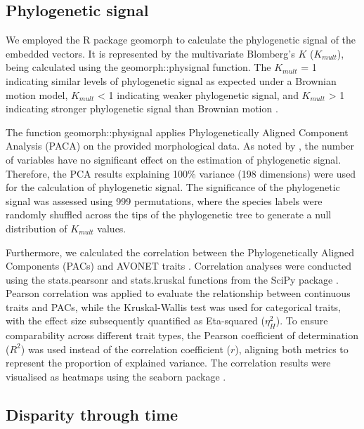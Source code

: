 \subsection{Phylogenetic signal}\label{subsec:mm-phylogenetic-signal}

We employed the R package geomorph to calculate the phylogenetic signal of the embedded vectors. It is represented by the multivariate Blomberg's $ K $ ($ K_{mult} $), being calculated using the geomorph::physignal function. The $ K_{mult} $ = 1 indicating similar levels of phylogenetic signal as expected under a Brownian motion model, $ K_{mult} $ < 1 indicating weaker phylogenetic signal, and $ K_{mult} $ > 1 indicating stronger phylogenetic signal than Brownian motion \parencite{adams2014generalized}. 

The function geomorph::physignal applies Phylogenetically Aligned Component Analysis (PACA) on the provided morphological data. As noted by \textcite{collyer2021phylogenetically}, the number of variables have no significant effect on the estimation of phylogenetic signal. Therefore, the PCA results explaining 100\% variance (198 dimensions) were used for the calculation of phylogenetic signal. The significance of the phylogenetic signal was assessed using 999 permutations, where the species labels were randomly shuffled across the tips of the phylogenetic tree to generate a null distribution of $ K_{mult} $ values.

Furthermore, we calculated the correlation between the Phylogenetically Aligned Components (PACs) and AVONET traits \parencite{tobias2022avonet}. Correlation analyses were conducted using the stats.pearsonr and stats.kruskal functions from the SciPy package \parencite{Gommers2025Scipy}. Pearson correlation was applied to evaluate the relationship between continuous traits and PACs, while the Kruskal-Wallis test was used for categorical traits, with the effect size subsequently quantified as Eta-squared ($\eta^2_H$). To ensure comparability across different trait types, the Pearson coefficient of determination ($R^2$) was used instead of the correlation coefficient ($r$), aligning both metrics to represent the proportion of explained variance. The correlation results were visualised as heatmaps using the seaborn package \parencite{Waskom2021Seaborn}.

\subsection{Disparity through time}\label{subsec:mm-disparity-through-time}


